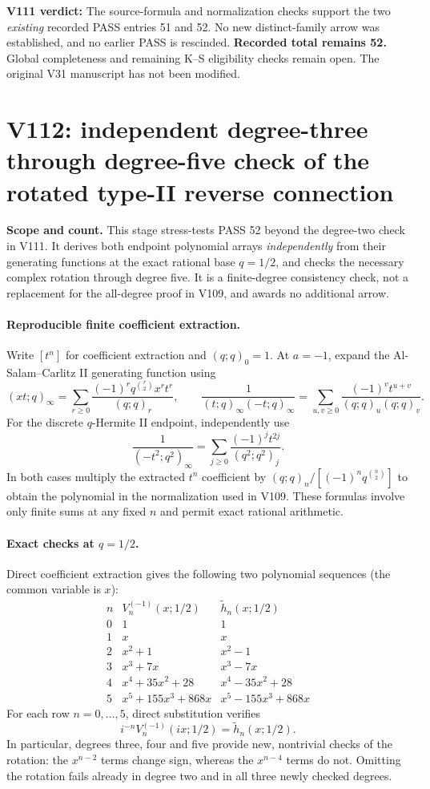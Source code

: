 \documentclass[11pt]{article}
\begin{document}
\noindent\textbf{V111 verdict:} The source-formula and normalization checks support the two \emph{existing} recorded PASS entries 51 and 52. No new distinct-family arrow was established, and no earlier PASS is rescinded. \textbf{Recorded total remains 52.} Global completeness and remaining K--S eligibility checks remain open. The original V31 manuscript has not been modified.



\clearpage
\section{V112: independent degree-three through degree-five check of the rotated type-II reverse connection}
\noindent\textbf{Scope and count.} This stage stress-tests PASS 52 beyond the degree-two check in V111. It derives both endpoint polynomial arrays \emph{independently} from their generating functions at the exact rational base $q=1/2$, and checks the necessary complex rotation through degree five. It is a finite-degree consistency check, not a replacement for the all-degree proof in V109, and awards no additional arrow.

\paragraph{Reproducible finite coefficient extraction.}
Write $[t^n]$ for coefficient extraction and $(q;q)_0=1$. At $a=-1$, expand the Al-Salam--Carlitz II generating function using
\[
 (xt;q)_\infty=\sum_{r\ge0}\frac{(-1)^r q^{\binom r2}x^r t^r}{(q;q)_r},\qquad
 \frac1{(t;q)_\infty(-t;q)_\infty}
 =\sum_{u,v\ge0}\frac{(-1)^v t^{u+v}}{(q;q)_u(q;q)_v}.
\]
For the discrete $q$-Hermite II endpoint, independently use
\[
 \frac1{(-t^2;q^2)_\infty}
 =\sum_{j\ge0}\frac{(-1)^j t^{2j}}{(q^2;q^2)_j}.
\]
In both cases multiply the extracted $t^n$ coefficient by
$(q;q)_n/[(-1)^n q^{\binom n2}]$ to obtain the polynomial in the normalization used in V109. These formulas involve only finite sums at any fixed $n$ and permit exact rational arithmetic.

\paragraph{Exact checks at $q=1/2$.}
Direct coefficient extraction gives the following two polynomial sequences (the common variable is $x$):
\[
\begin{array}{c|l|l}
 n & V_n^{(-1)}(x;1/2)&\widetilde h_n(x;1/2)\\\hline
 0&1&1\\
 1&x&x\\
 2&x^2+1&x^2-1\\
 3&x^3+7x&x^3-7x\\
 4&x^4+35x^2+28&x^4-35x^2+28\\
 5&x^5+155x^3+868x&x^5-155x^3+868x
\end{array}
\]
For each row $n=0,\ldots,5$, direct substitution verifies
\[
 \boxed{i^{-n}V_n^{(-1)}(ix;1/2)=\widetilde h_n(x;1/2).}
\]
In particular, degrees three, four and five provide new, nontrivial checks of the rotation: the $x^{n-2}$ terms change sign, whereas the $x^{n-4}$ terms do not. Omitting the rotation fails already in degree two and in all three newly checked degrees.
\end{document}
